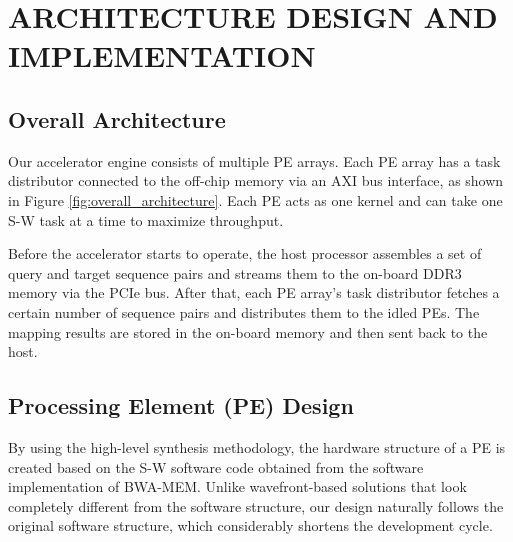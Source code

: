 \section{ARCHITECTURE DESIGN AND IMPLEMENTATION} 
\label{sec:architecture}
\subsection{Overall Architecture}

Our accelerator engine consists of multiple PE arrays. Each PE array has a task distributor connected to the off-chip memory via an AXI bus interface, as shown in Figure \ref{fig:overall_architecture}.
Each PE acts as one kernel and can take one S-W task at a time to maximize throughput.

Before the accelerator starts to operate, the host processor assembles a set of query and target sequence pairs and streams them to the on-board DDR3 memory via the PCIe bus. 
After that, each PE array's task distributor fetches a certain number of sequence pairs and distributes them to the idled PEs. 
The mapping results are stored in the on-board memory and then sent back to the host.
\subsection{Processing Element (PE) Design}
By using the high-level synthesis methodology, the hardware structure of a PE is created based on the S-W software code obtained from the software implementation of BWA-MEM.
Unlike wavefront-based solutions that look completely different from the software structure,  
our design naturally follows the original software structure, which considerably shortens the development cycle. 

